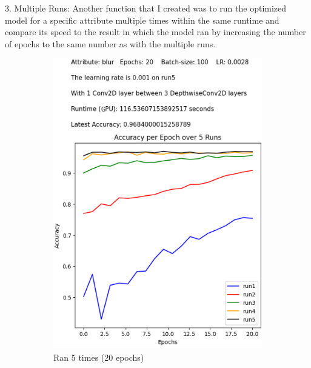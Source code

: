 \documentclass{article}
\begin{document}
3. Multiple Runs: Another function that I created was to run the optimized model for a specific attribute multiple times within the same runtime and compare its speed to the result in which the model ran by increasing the number of epochs to the same number as with the multiple runs. 


\begin{figure}[h!]
  \centering
  \begin{subfigure}[b]{0.45\textwidth}
    \includegraphics[width=\textwidth]{blururur.png}
    \caption{Ran 5 times (20 epochs)}
  \end{subfigure}
  \hfill
  \begin{subfigure}[b]{0.45\textwidth}

\end{subfigure}
\end{figure}
\end{document}
